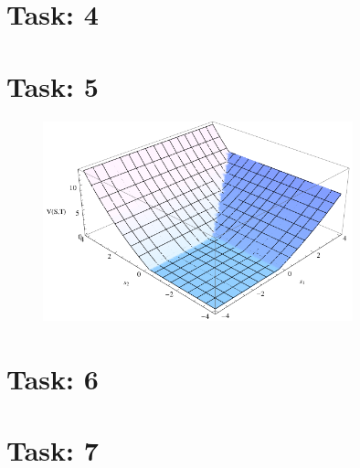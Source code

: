 \documentclass{article}
\begin{document}
\newpage

\section*{Task: 4}

\section*{Task: 5}

\begin{figure}[htbp]
  \centering
     \includegraphics[width=0.8\textwidth]{../Task05/task05_plot.pdf}
\end{figure}

\section*{Task: 6}

\section*{Task: 7}
\end{document}
